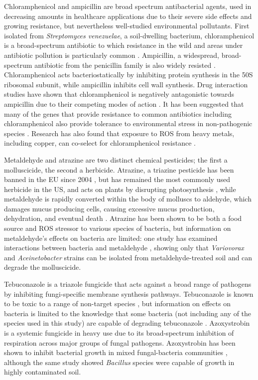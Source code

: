 \documentclass[review,12pt]{elsarticle}
\begin{document}
Chloramphenicol and ampicillin are broad spectrum antibacterial agents, used in decreasing amounts in healthcare applications due to their severe side effects and growing resistance, but nevertheless well-studied environmental pollutants. First isolated from \textit{Streptomyces venezuelae}, a soil-dwelling bacterium, chloramphenicol is a broad-spectrum antibiotic to which resistance in the wild and areas under antibiotic pollution is particularly common \cite{Allen2010CallEnvironments}. Ampicillin, a widespread, broad-spectrum antibiotic from the penicillin family is also widely resisted \cite{Ruiz1999MechanismsFish}. Chloramphenicol acts bacteriostatically by inhibiting protein synthesis in the 50S ribosomal subunit, while ampicillin inhibits cell wall synthesis. Drug interaction studies have shown that chloramphenicol is negatively antagonistic towards ampicillin due to their competing modes of action \cite{vanBambeke2017MechanismsAction}. It has been suggested that many of the genes that provide resistance to common antibiotics including chloramphenicol also provide tolerance to environmental stress in non-pathogenic species \cite{Groh2007GenesResistance}. Research has also found that exposure to ROS from heavy metals, including copper, can co-select for chloramphenicol resistance \cite{Harrison2009ChromosomalTolerance}.

Metaldehyde and atrazine are two distinct chemical pesticides; the first a molluscicide, the second a herbicide. Atrazine, a triazine pesticide has been banned in the EU since 2004 \cite{EU2004CommissionSubstance}, but has remained the most commonly used herbicide in the US, and acts on plants by disrupting photosynthesis \cite{Shimabukuro1969AtrazineAction}, while metaldehyde is rapidly converted within the body of molluscs to aldehyde, which damages mucus producing cells, causing excessive mucus production, dehydration, and eventual death \cite{Triebskorn1998EffetcsExposure}. Atrazine has been shown to be both a food source \cite{Wackett2002BiodegradationStudies} and ROS stressor \cite{Zhang2012OxidativeAtrazine} to various species of bacteria, but information on metaldehyde’s effects on bacteria are limited: one study has examined interactions between bacteria and metaldehyde \cite{Thomas2017IsolationSoils}, showing only that \textit{Variovorax} and \textit{Aceinetobacter} strains can be isolated from metaldehyde-treated soil and can degrade the molluscicide.

Tebuconazole is a triazole fungicide that acts against a broad range of pathogens by inhibiting fungi-specific membrane synthesis pathways. Tebuconazole is known to be toxic to a range of non-target species \cite{Sehnem2010}, but information on effects on bacteria is limited to the knowledge that some bacteria (not including any of the species used in this study) are capable of degrading tebuconazole \cite{Sehnem2010}. Azoxystrobin is a systemic fungicide in heavy use due to its broad-spectrum inhibition of respiration across major groups of fungal pathogens. Azoxystrobin has been shown to inhibit bacterial growth in mixed fungal-bacteria communities \cite{Bacmaga2015MicrobialAzoxystrobin.}, although the same study showed \textit{Bacillus} species were capable of growth in highly contaminated soil.
\end{document}
